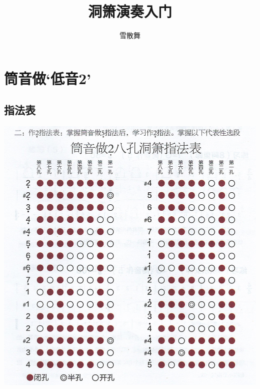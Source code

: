 \documentclass[cn,pad,chinese,chinesefont=nofont]{elegantbook}
\title{洞箫演奏入门}
\author{雪散舞}
\date{\zhtoday}
\begin{document}
\maketitle
\frontmatter
\tableofcontents
\mainmatter

\centering
\chapter{筒音做‘低音2’}
\section{指法表}
\includegraphics[width=\textwidth]{dongxiao/Scan 4.1.jpeg}
\end{document}
